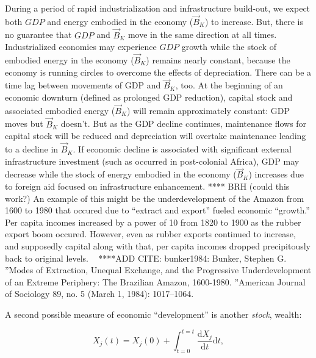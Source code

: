 During a period of rapid industrialization and infrastructure build-out, 
we expect both $GDP$ and energy embodied in the economy ($\vec{B}_{K}$)
to increase.
But, there is no guarantee that $GDP$ and $\vec{B}_{K}$ move 
in the same direction at all times.
Industrialized economies may experience $GDP$ growth while 
the stock of embodied energy in the economy ($\vec{B}_{K}$) remains nearly constant,
because the economy is running circles to overcome the effects of depreciation.
There can be a time lag between movements of GDP and $\vec{B}_{K}$, too.
At the beginning of an economic downturn (defined as prolonged GDP reduction),
capital stock and associated embodied energy ($\vec{B}_{K}$) will remain approximately constant:
GDP moves but $\vec{B}_{K}$ doesn't.
But as the GDP decline continues, 
maintenance flows for capital stock will be reduced
and depreciation will overtake maintenance leading to a decline in $\vec{B}_{K}$. 
If economic decline is associated with significant external 
infrastructure investment (such as occurred in post-colonial Africa),
GDP may decrease 
while the stock of energy embodied in the economy ($\vec{B}_{K}$) increases 
due to foreign aid focused on infrastructure enhancement. 
**** BRH (could this work?) An example of this
might be the underdevelopment of the Amazon from 1600 to 1980 that occured due
to ``extract and export'' fueled economic ``growth.'' Per capita incomes increased by 
a power of 10 from 1820 to 1900 as the rubber export boom occured. However, 
even as rubber exports continued to increase, and supposedly capital
along with that, per capita incomes dropped precipitously back to original levels. ~\cite{bunker1984}
****ADD CITE: bunker1984: Bunker, Stephen G. ''Modes of Extraction, Unequal Exchange, 
and the Progressive Underdevelopment of an Extreme Periphery: The Brazilian Amazon, 1600-1980.
''American Journal of Sociology 89, no. 5 (March 1, 1984): 1017–1064.



A second possible measure of economic ``development'' is another \emph{stock}, 
wealth:

\begin{equation} \label{eq:Dev_Integral_Wealth}
	X_{j}(t) 
	= X_{j}(0) 
	+ \int_{t=0}^{t=t} \frac{\mathrm{d}X_{j}}{\mathrm{d}t}\mathrm{d}t,
\end{equation}

